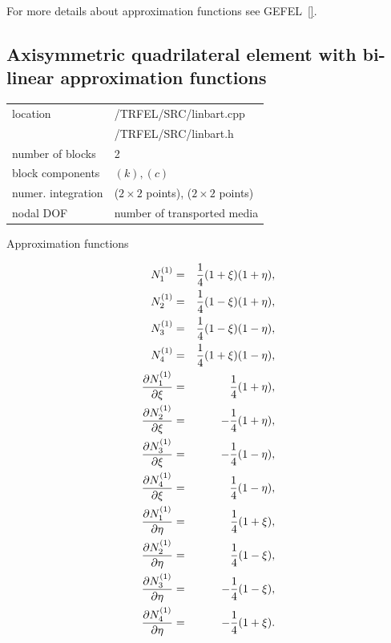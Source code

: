 For more details about approximation functions see GEFEL~\ref{}.

\subsection{Axisymmetric quadrilateral element with bi-linear approximation functions}
\label{qualaxt}


\begin{center}
\begin{tabular}{|l|l|}
\hline
location & /TRFEL/SRC/linbart.cpp\\
         & /TRFEL/SRC/linbart.h
\\ \hline
number of blocks & 2
\\ \hline
block components & $(k), (c)$
\\ \hline
numer. integration & ($2 \times 2$ points), ($2 \times 2$ points)
\\ \hline
nodal DOF & number of transported media
\\ \hline
\end{tabular}
\end{center}

Approximation functions

\begin{eqnarray}
N_1^{(1)} &=& \mbox{$\displaystyle\frac{1}{4}$} (1 + \xi) (1 + \eta),\nonumber\\
N_2^{(1)} &=& \mbox{$\displaystyle\frac{1}{4}$} (1 - \xi) (1 + \eta),\nonumber\\
N_3^{(1)} &=& \mbox{$\displaystyle\frac{1}{4}$} (1 - \xi) (1 - \eta),\nonumber\\
N_4^{(1)} &=& \mbox{$\displaystyle\frac{1}{4}$} (1 + \xi) (1 - \eta),\\
\mbox{$\displaystyle\frac{\partial{N_1^{(1)}}}{\partial{\xi}}$} &=& \mbox{$\displaystyle\frac{1}{4}$} (1 + \eta),\nonumber\\
\mbox{$\displaystyle\frac{\partial{N_2^{(1)}}}{\partial{\xi}}$} &=& - \mbox{$\displaystyle\frac{1}{4}$} (1 + \eta),\nonumber\\
\mbox{$\displaystyle\frac{\partial{N_3^{(1)}}}{\partial{\xi}}$} &=& - \mbox{$\displaystyle\frac{1}{4}$} (1 - \eta),\nonumber\\
\mbox{$\displaystyle\frac{\partial{N_4^{(1)}}}{\partial{\xi}}$} &=& \mbox{$\displaystyle\frac{1}{4}$} (1 - \eta),\nonumber\\
\mbox{$\displaystyle\frac{\partial{N_1^{(1)}}}{\partial{\eta}}$} &=& \mbox{$\displaystyle\frac{1}{4}$} (1 + \xi),\nonumber\\
\mbox{$\displaystyle\frac{\partial{N_2^{(1)}}}{\partial{\eta}}$} &=& \mbox{$\displaystyle\frac{1}{4}$} (1 - \xi),\nonumber\\
\mbox{$\displaystyle\frac{\partial{N_3^{(1)}}}{\partial{\eta}}$} &=& - \mbox{$\displaystyle\frac{1}{4}$} (1 - \xi),\nonumber\\
\mbox{$\displaystyle\frac{\partial{N_4^{(1)}}}{\partial{\eta}}$} &=& - \mbox{$\displaystyle\frac{1}{4}$} (1 + \xi).\nonumber
\end{eqnarray}
